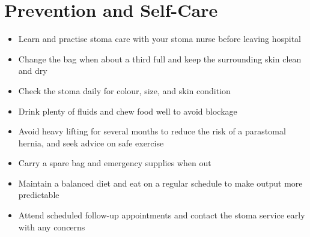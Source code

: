 \section*{Prevention and Self-Care}
\begin{itemize}
    \item Learn and practise stoma care with your stoma nurse before leaving hospital
    \item Change the bag when about a third full and keep the surrounding skin clean and dry
    \item Check the stoma daily for colour, size, and skin condition
    \item Drink plenty of fluids and chew food well to avoid blockage
    \item Avoid heavy lifting for several months to reduce the risk of a parastomal hernia, and seek advice on safe exercise
    \item Carry a spare bag and emergency supplies when out
    \item Maintain a balanced diet and eat on a regular schedule to make output more predictable
    \item Attend scheduled follow-up appointments and contact the stoma service early with any concerns
\end{itemize}
